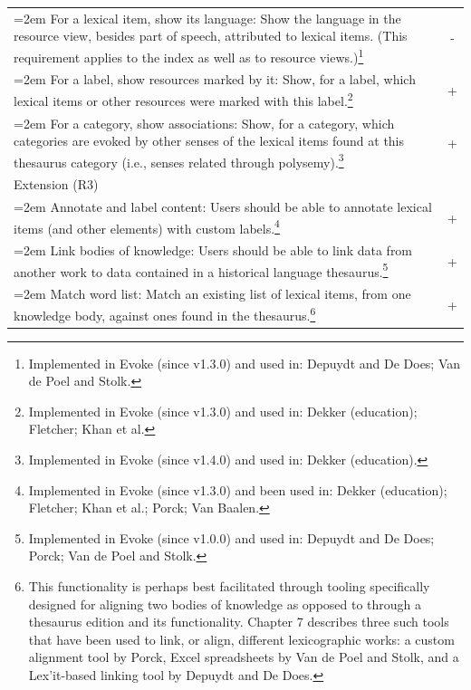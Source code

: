 \begin{longtable}[h!]{>{\raggedright\small}p{4.5in}c}
	\hangindent=2em
	For a lexical item, show its language: \linebreak
	Show the language in the resource view, besides part of speech, attributed to lexical items.
	(This requirement applies to the index as well as to resource views.)\footnote{Implemented in Evoke (since v1.3.0) and used in: Depuydt and De Does; Van de Poel and Stolk.} & - \\
	
	\hangindent=2em
	For a label, show resources marked by it: \linebreak
	Show, for a label, which lexical items or other resources were marked with this label.\footnote{Implemented in Evoke (since v1.3.0) and used in: Dekker (education); Fletcher; Khan et al.} & + \\

    \hangindent=2em
	For a category, show associations: \linebreak
	Show, for a category, which categories are evoked by other senses of the lexical items found at this thesaurus category (i.e., senses related through polysemy).\footnote{Implemented in Evoke (since v1.4.0) and used in: Dekker (education).} & + \\
	

\rowcolor{lightgray!50!}Extension (R3) &\\

	\hangindent=2em
	Annotate and label content: \linebreak
	Users should be able to annotate lexical items (and other elements) with custom labels.\footnote{Implemented in Evoke (since v1.3.0) and been used in: Dekker (education); Fletcher; Khan et al.; Porck; Van Baalen.} & + \\
	
	\hangindent=2em
	Link bodies of knowledge: \linebreak
	Users should be able to link data from another work to data contained in a historical language thesaurus.\footnote{Implemented in Evoke (since v1.0.0) and used in: Depuydt and De Does; Porck; Van de Poel and Stolk.} & + \\

    \hangindent=2em
    Match word list: \linebreak
    Match an existing list of lexical items, from one knowledge body, against ones found in the thesaurus.\footnote{This functionality is perhaps best facilitated through tooling specifically designed for aligning two bodies of knowledge as opposed to through a thesaurus edition and its functionality. Chapter 7 describes three such tools that have been used to link, or align, different lexicographic works: a custom alignment tool by Porck, Excel spreadsheets by Van de Poel and Stolk, and a Lex'it-based linking tool by Depuydt and De Does.} & + \\


\end{longtable}
